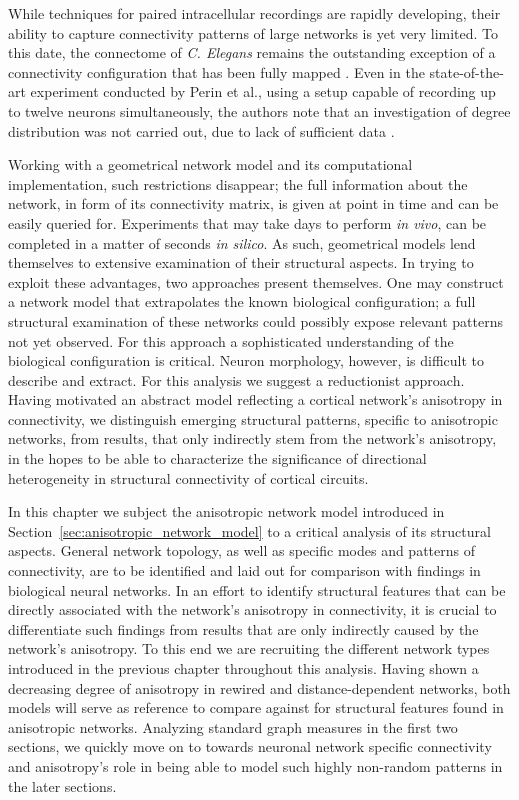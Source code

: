 While techniques for paired intracellular recordings are rapidly
developing, their ability to capture connectivity patterns of large
networks is yet very limited. To this date, the connectome of
\textit{C. Elegans} remains the outstanding exception of a
connectivity configuration that has been fully mapped
\parencite{White1986}. Even in the state-of-the-art experiment
conducted by Perin et al., using a setup capable of recording up to
twelve neurons simultaneously, the authors note that an investigation
of degree distribution was not carried out, due to lack of sufficient
data
\parencite{Perin2011}.

Working with a geometrical network model and its computational
implementation, such restrictions disappear; the full information
about the network, in form of its connectivity matrix, is given at
point in time and can be easily queried for. Experiments that may take
days to perform \textit{in vivo}, can be completed in a matter of
seconds \textit{in silico}. As such, geometrical models lend
themselves to extensive examination of their structural aspects.  In
trying to exploit these advantages, two approaches present
themselves. One may construct a network model that extrapolates the
known biological configuration; a full structural examination of these
networks could possibly expose relevant patterns not yet observed. For
this approach a sophisticated understanding of the biological
configuration is critical. Neuron morphology, however, is difficult to
describe and extract. For this analysis we suggest a reductionist
approach. Having motivated an abstract model reflecting a cortical
network's anisotropy in connectivity, we distinguish emerging
structural patterns, specific to anisotropic networks, from results,
that only indirectly stem from the network's anisotropy, in the hopes
to be able to characterize the significance of directional
heterogeneity in structural connectivity of cortical circuits.


In this chapter we subject the anisotropic network model introduced in
Section~\ref{sec:anisotropic_network_model} to a critical analysis of
its structural aspects. General network topology, as well as specific
modes and patterns of connectivity, are to be identified and laid out
for comparison with findings in biological neural networks.  In an
effort to identify structural features that can be directly associated
with the network's anisotropy in connectivity,  it is crucial to
differentiate such findings from results that are only indirectly
caused by the network's anisotropy. To this end we are recruiting the
different network types introduced in the previous chapter throughout
this analysis. Having shown a decreasing degree of anisotropy in
rewired and distance-dependent networks, both models will serve as
reference to compare against for structural features found in
anisotropic networks. Analyzing standard graph measures in the first
two sections, we quickly move on to towards neuronal network specific
connectivity and anisotropy's role in being able to model such highly
non-random patterns in the later sections.


